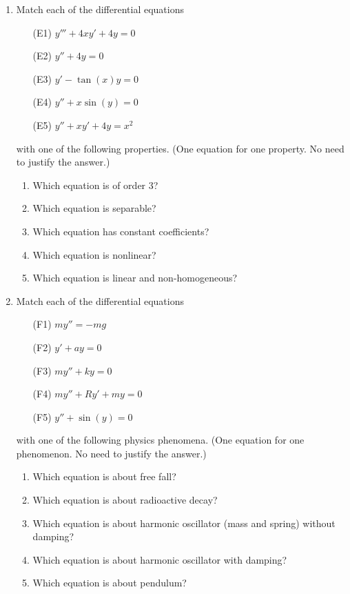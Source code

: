 \documentclass[12pt]{article}
\begin{document}
\begin{enumerate}
\item Match each of the differential equations
\begin{enumerate}[label=(\roman*)]
\item [(E1)] $y'''+4xy'+4y=0$ %
\item [(E2)] $y''+4y=0$ %
\item [(E3)] $y'-\tan(x)y=0$ %
\item [(E4)] $y''+x\sin(y)=0$ %
\item [(E5)] $y''+xy'+4y=x^2$ %
\end{enumerate}
with one of the following properties. (One equation for one property. No need to justify the answer.)
\begin{enumerate}
\item Which equation is of order 3?
\item Which equation is separable?
\item Which equation has constant coefficients?
\item Which equation is nonlinear?
\item Which equation is linear and non-homogeneous?
\end{enumerate}

\item Match each of the differential equations
\begin{enumerate}
\item [(F1)] $my''=-mg$ %
\item [(F2)] $y'+ay=0$ %
\item [(F3)] $my''+ky=0$ %
\item [(F4)] $my''+Ry'+my=0$ %
\item [(F5)]  $y''+\sin(y)=0$ %
\end{enumerate}
with one of the following physics phenomena. (One equation for one phenomenon. No need to justify the answer.)

\begin{enumerate}
\item Which equation is about free fall?
\item Which equation is about radioactive decay?
\item Which equation is about harmonic oscillator (mass and spring) without damping?
\item Which equation is about harmonic oscillator with damping?
\item Which equation is about pendulum?
\end{enumerate}


\end{enumerate}
\end{document}
